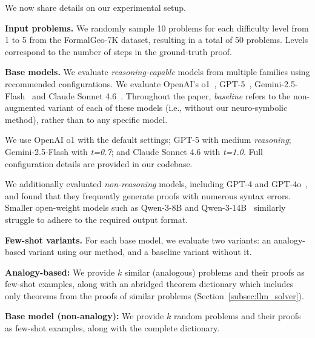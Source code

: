 


We now share details on our experimental setup.

\noindent\textbf{Input problems.}
We randomly sample 10 problems for each difficulty level from 1 to 5 from the FormalGeo-7K dataset, resulting in a total of 50 problems. Levels correspond to the number of steps in the ground-truth proof. %

\noindent\textbf{Base models.} 
We evaluate \emph{reasoning-capable} models from multiple families using recommended configurations. 
We evaluate OpenAI's o1~\cite{jaech2024openai}, GPT-5~\cite{gpt-5}, Gemini-2.5-Flash~\cite{comanici2025gemini} and Claude Sonnet 4.6~\cite{claude_sonnet_4.6}. Throughout the paper, \emph{baseline} refers to the non-augmented variant of each of these models (i.e., without our neuro-symbolic method), rather than to any specific model.


We use OpenAI o1 with the default settings; GPT-5 with medium \emph{reasoning}; Gemini-2.5-Flash with \emph{t=0.7}; and Claude Sonnet 4.6 with \emph{t=1.0}. Full configuration details are provided in our codebase.


We additionally evaluated \emph{non-reasoning} models, including GPT-4 and GPT-4o~\cite{achiam2023gpt, hurst2024gpt}, and found that they frequently generate proofs with numerous syntax errors. 
Smaller open-weight models such as Qwen-3-8B and Qwen-3-14B~\cite{yang2025qwen3} similarly struggle to adhere to the required output format.






\noindent\textbf{Few-shot variants.}  
For each base model, we evaluate two variants: an analogy-based variant using our method, and a baseline variant without it.
\begin{compactitem}
  \item \textbf{Analogy-based:} We provide $k$ similar (analogous) problems and their proofs as few-shot examples, along with an abridged theorem dictionary which includes only theorems from the proofs of similar problems (Section~\ref{subsec:llm_solver}).
  \item \textbf{Base model (non-analogy):} We provide $k$ random problems and their proofs as few-shot examples, along with the complete dictionary.
\end{compactitem}

 

